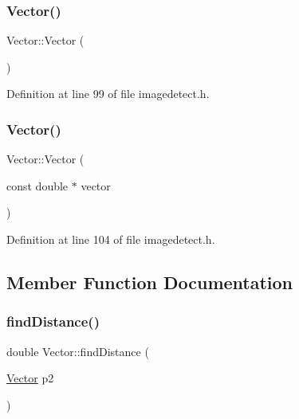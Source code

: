 \subsubsection{\texorpdfstring{Vector()}{Vector()}\hspace{0.1cm}{\footnotesize\ttfamily [1/2]}}
{\footnotesize\ttfamily Vector\+::\+Vector (\begin{DoxyParamCaption}{ }\end{DoxyParamCaption})\hspace{0.3cm}{\ttfamily [inline]}}



Definition at line 99 of file imagedetect.\+h.

\mbox{\label{struct_vector_a431b04a497a5ac4b65717f2f673aa306}} 
\subsubsection{\texorpdfstring{Vector()}{Vector()}\hspace{0.1cm}{\footnotesize\ttfamily [2/2]}}
{\footnotesize\ttfamily Vector\+::\+Vector (\begin{DoxyParamCaption}\item[{const double $\ast$}]{vector }\end{DoxyParamCaption})\hspace{0.3cm}{\ttfamily [inline]}}



Definition at line 104 of file imagedetect.\+h.



\subsection{Member Function Documentation}
\mbox{\label{struct_vector_a42534c51ed36bbe7286464c30d50b042}} 
\subsubsection{\texorpdfstring{findDistance()}{findDistance()}}
{\footnotesize\ttfamily double Vector\+::find\+Distance (\begin{DoxyParamCaption}\item[{\mbox{\hyperlink{struct_vector}{Vector}}}]{p2 }\end{DoxyParamCaption})\hspace{0.3cm}{\ttfamily [inline]}}



